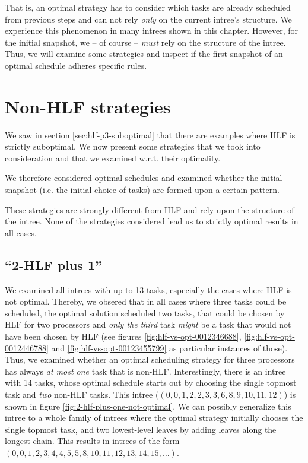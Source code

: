 That is, an optimal strategy has to consider which tasks are already scheduled from previous steps and can not rely \emph{only} on the current intree's structure. We experience this phenomenon in many intrees shown in this chapter. However, for the initial snapshot, we -- of course -- \emph{must} rely on the structure of the intree. Thus, we will examine some strategies and inspect if the first snapshot of an optimal schedule adheres specific rules.

\section{Non-HLF strategies}
\label{sec:suboptimal-non-hlf-strategies}

We saw in section \ref{sec:hlf-p3-suboptimal} that there are examples where HLF is strictly suboptimal. We now present some strategies that we took into consideration and that we examined w.r.t. their optimality. 

We therefore considered optimal schedules and examined whether the initial snapshot (i.e. the initial choice of tasks) are formed upon a certain pattern.

These strategies are strongly different from HLF and rely upon the structure of the intree. None of the strategies considered lead us to strictly optimal results in all cases.

\subsection{``2-HLF plus 1''}
\label{sec:disproving-2hlf-plus-1}

We examined all intrees with up to 13 tasks, especially the cases where HLF is not optimal. Thereby, we obsered that in all cases where three tasks could be scheduled, the optimal solution scheduled two tasks, that could be chosen by HLF for two processors and \emph{only the third} task \emph{might} be a task that would not have been chosen by HLF (see figures \ref{fig:hlf-vs-opt-0012346688}, \ref{fig:hlf-vs-opt-0012446788} and \ref{fig:hlf-vs-opt-00123455799} as particular instances of those). Thus, we examined whether an optimal scheduling strategy for three processors has always \emph{at most one} task that is non-HLF. Interestingly, there is an intree with 14 tasks, whose optimal schedule starts out by choosing the single topmost task and \emph{two} non-HLF tasks. This intree ($(0,0,1,2,2,3,3,6,8,9,10,11,12)$) is shown in figure \ref{fig:2-hlf-plus-one-not-optimal}. We can possibly generalize this intree to a whole family of intrees where the optimal strategy initially chooses the single topmost task, and two lowest-level leaves by adding leaves along the longest chain. This results in intrees of the form $(0, 0, 1, 2, 3, 4, 4, 5, 5, 8, 10, 11, 12, 13, 14, 15,\dots)$.

